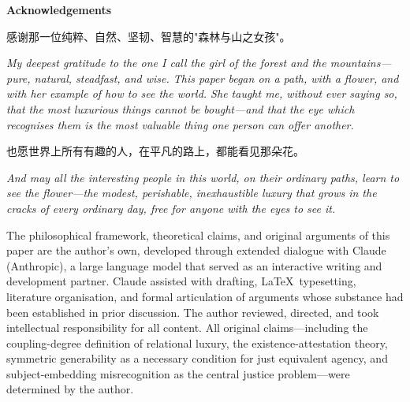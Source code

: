 \newpage
\goldrule
\begin{center}
{\large\bfseries\color{rosedeep} Acknowledgements}
\end{center}
\goldrule

\vspace{0.8em}

\noindent
{\cjk 感谢那一位纯粹、自然、坚韧、智慧的"森林与山之女孩"。}

\vspace{0.4em}

\noindent
\textit{My deepest gratitude to the one I call the girl of the forest and the mountains---pure, natural, steadfast, and wise. This paper began on a path, with a flower, and with her example of how to see the world. She taught me, without ever saying so, that the most luxurious things cannot be bought---and that the eye which recognises them is the most valuable thing one person can offer another.}

\vspace{1.2em}

\noindent
{\cjk 也愿世界上所有有趣的人，在平凡的路上，都能看见那朵花。}

\vspace{0.4em}

\noindent
\textit{And may all the interesting people in this world, on their ordinary paths, learn to see the flower---the modest, perishable, inexhaustible luxury that grows in the cracks of every ordinary day, free for anyone with the eyes to see it.}

\vspace{1.8em}

\goldrule

\vspace{1.2em}


\vspace{0.4em}

\noindent
The philosophical framework, theoretical claims, and original arguments of this paper are the author's own, developed through extended dialogue with Claude (Anthropic), a large language model that served as an interactive writing and development partner. Claude assisted with drafting, \LaTeX\ typesetting, literature organisation, and formal articulation of arguments whose substance had been established in prior discussion. The author reviewed, directed, and took intellectual responsibility for all content. All original claims---including the coupling-degree definition of relational luxury, the existence-attestation theory, symmetric generability as a necessary condition for just equivalent agency, and subject-embedding misrecognition as the central justice problem---were determined by the author.

\vspace{1.0em}

\goldrule
